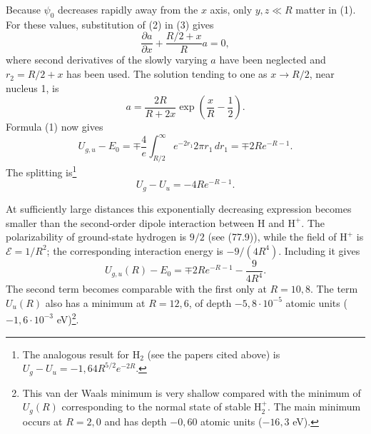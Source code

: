 Because $\psi_0$ decreases rapidly away from the $x$ axis, only $y,z\ll R$ matter in (1). For these values, substitution of (2) in (3) gives
\[
\frac{\partial a}{\partial x}+\frac{R/2+x}{R}a=0,
\]
where second derivatives of the slowly varying $a$ have been neglected and $r_2=R/2+x$ has been used. The solution tending to one as $x\to R/2$, near nucleus 1, is
\[
a=\frac{2R}{R+2x}\exp\left(\frac{x}{R}-\frac12\right).
\]
Formula (1) now gives
\[
U_{g,u}-E_0=\mp\frac4e\int_{R/2}^{\infty}e^{-2r_1}2\pi r_1\,dr_1=\mp2Re^{-R-1}.
\]
The splitting is\footnote{The analogous result for $\mathrm H_2$ (see the papers cited above) is $U_g-U_u=-1{,}64R^{5/2}e^{-2R}$.}
\begin{equation}U_g-U_u=-4Re^{-R-1}.\tag{4}\end{equation}

At sufficiently large distances this exponentially decreasing expression becomes smaller than the second-order dipole interaction between H and $\mathrm H^+$. The polarizability of ground-state hydrogen is $9/2$ (see (77.9)), while the field of $\mathrm H^+$ is $\mathcal E=1/R^2$; the corresponding interaction energy is $-9/(4R^4)$. Including it gives
\begin{equation}U_{g,u}(R)-E_0=\mp2Re^{-R-1}-\frac9{4R^4}.\tag{5}\end{equation}
The second term becomes comparable with the first only at $R=10{,}8$. The term $U_u(R)$ also has a minimum at $R=12{,}6$, of depth $-5{,}8\cdot10^{-5}$ atomic units ($-1{,}6\cdot10^{-3}$ eV)\footnote{This van der Waals minimum is very shallow compared with the minimum of $U_g(R)$ corresponding to the normal state of stable $\mathrm H_2^+$. The main minimum occurs at $R=2{,}0$ and has depth $-0{,}60$ atomic units ($-16{,}3$ eV).}.
